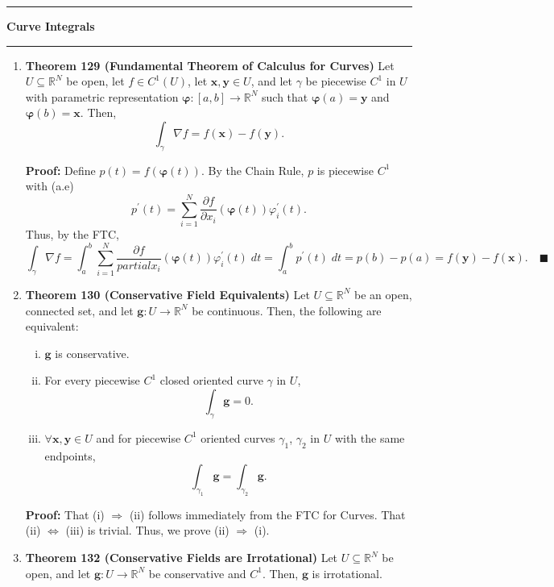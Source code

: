 \documentclass[11pt]{article}
\newcommand{\bvarphi}{\boldsymbol{\varphi}}
\begin{document}
\hrule
{\Large \bf Curve Integrals}
\vspace{1mm}
\hrule
\begin{enumerate}
\item \textbf{Theorem 129 (Fundamental Theorem of Calculus for Curves)} Let
$U \subseteq \mathbb{R}^N$ be open, let $f \in C^1(U)$, let
$\mathbf{x},\mathbf{y} \in U$, and let $\gamma$ be piecewise $C^1$ in $U$ with
parametric representation $\bvarphi: [a,b] \rightarrow \mathbb{R}^N$ such that
$\bvarphi(a) = \mathbf{y}$ and $\bvarphi(b) = \mathbf{x}$. Then,
\[\int_{\gamma}\nabla f = f(\mathbf{x}) - f(\mathbf{y}).\]

{\bf Proof:} Define $p(t) = f(\bvarphi(t))$. By the Chain Rule, $p$ is
piecewise $C^1$ with (a.e)
\[p^{\prime}(t)
 = \sum_{i = 1}^N
             \frac{\partial f}{\partial x_i}(\bvarphi(t))\varphi_i^{\prime}(t)
.\]
Thus, by the FTC,
\[\int_{\gamma}\nabla f
 = \int_a^b \sum_{i = 1}^N
        \frac{\partial f}{partial x_i}(\bvarphi(t))\varphi_i^{\prime}(t) \; dt
 = \int_a^b p^{\prime}(t) \; dt = p(b) - p(a) = f(\mathbf{y}) - f(\mathbf{x})
. \quad \blacksquare\]

\item \textbf{Theorem 130 (Conservative Field Equivalents)} Let
$U \subseteq \mathbb{R}^N$ be an open, connected set, and let
$\mathbf{g}: U \rightarrow \mathbb{R}^N$ be continuous. Then, the following
are equivalent:
\begin{enumerate}[(i)]
\item $\mathbf{g}$ is conservative.

\item For every piecewise $C^1$ closed oriented curve $\gamma$ in $U$,
\[\int_{\gamma} \mathbf{g} = 0.\]

\item $\forall \mathbf{x},\mathbf{y} \in U$ and for piecewise $C^1$ oriented
curves $\gamma_1$, $\gamma_2$ in $U$ with the same endpoints,
\[\int_{\gamma_1} \mathbf{g} = \int_{\gamma_2} \mathbf{g}.\]
\end{enumerate}

{\bf Proof:} That (i) $\Rightarrow$ (ii) follows immediately from the FTC for
Curves. That (ii) $\Leftrightarrow$ (iii) is trivial. Thus, we prove
(ii) $\Rightarrow$ (i).

\item \textbf{Theorem 132 (Conservative Fields are Irrotational)} Let
$U \subseteq \mathbb{R}^N$ be open, and let
$\mathbf{g}: U \rightarrow \mathbb{R}^N$ be conservative and $C^1$. Then,
$\mathbf{g}$ is irrotational.


\end{enumerate}
\end{document}
